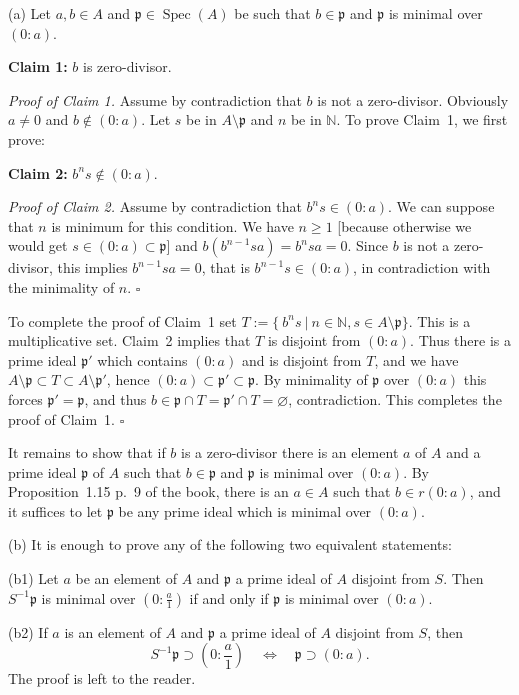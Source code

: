 \documentclass[12pt,letterpaper]{article}%
\newcommand{\mf}{\mathfrak}
\newcommand{\ppp}{\mf p}
\newcommand{\Spec}{\operatorname{Spec}}\newcommand{\Sp}{\operatorname{Spec}}
\newcommand{\nn}{\noindent}
\begin{document}
\nn(a) Let $a,b\in A$ and $\ppp\in\Spec(A)$ be such that $b\in\ppp$ and $\ppp$ is minimal over $(0:a)$.

\nn\textbf{Claim 1:} $b$ is zero-divisor.

\nn\emph{Proof of Claim 1.} Assume by contradiction that $b$ is not a zero-divisor. Obviously $a\ne0$ and $b\notin(0:a)$. Let $s$ be in $A\setminus\ppp$ and $n$ be in $\mathbb N$. To prove Claim~1, we first prove:

\nn\textbf{Claim 2:} $b^ns\notin(0:a)$.

\nn\emph{Proof of Claim 2.} Assume by contradiction that $b^ns\in(0:a)$. We can suppose that $n$ is minimum for this condition. We have $n\ge1$ [because otherwise we would get $s\in(0:a)\subset\ppp$] and $b(b^{n-1}sa)=b^nsa=0$. Since $b$ is not a zero-divisor, this implies $b^{n-1}sa=0$, that is $b^{n-1}s\in(0:a)$, in contradiction with the minimality of $n$. $\square$

To complete the proof of Claim~1 set $T:=\{\ b^ns\ |\ n\in\mathbb N,s\in A\setminus\ppp\}$. This is a multiplicative set. Claim~2 implies that $T$ is disjoint from $(0:a)$. Thus there is a prime ideal $\ppp'$ which contains $(0:a)$ and is disjoint from $T$, and we have $A\setminus\ppp\subset T\subset A\setminus\ppp'$, hence $(0:a)\subset\ppp'\subset\ppp$. By minimality of $\ppp$ over $(0:a)$ this forces $\ppp'=\ppp$, and thus $b\in\ppp\cap T=\ppp'\cap T=\varnothing$, contradiction. This completes the proof of Claim~1. $\square$

It remains to show that if $b$ is a zero-divisor there is an element $a$ of $A$ and a prime ideal $\ppp$ of $A$ such that $b\in\ppp$ and $\ppp$ is minimal over $(0:a)$. By Proposition~1.15 p.~9 of the book, there is an $a\in A$ such that $b\in r(0:a)$, and it suffices to let $\ppp$ be any prime ideal which is minimal over $(0:a)$.%

\nn(b) It is enough to prove any of the following two equivalent statements: 

\nn(b1) Let $a$ be an element of $A$ and $\ppp$ a prime ideal of $A$ disjoint from $S$. Then $S^{-1}\ppp$ is minimal over $(0:\frac a1)$ if and only if $\ppp$ is minimal over $(0:a)$.

\nn(b2) If $a$ is an element of $A$ and $\ppp$ a prime ideal of $A$ disjoint from $S$, then 
$$
S^{-1}\ppp\supset\left(0:\frac a1\right)\quad\iff\quad\ppp\supset(0:a).
$$
The proof is left to the reader.%
\end{document}
